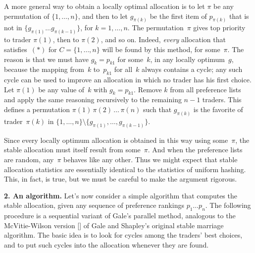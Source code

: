 A more general way to obtain a locally optimal allocation is to let $\pi$ be
any permutation of $\{1,\ldots,n\}$, and then to let $g_{\pi(k)}$ be the first
item of $p_{\pi(k)}$ that is not in $\{g_{\pi(1)}\ldots g_{\pi(k-1)}\}$, for
$k=1,\ldots,n$. The permutation~$\pi$ gives top priority to trader $\pi(1)$,
then to $\pi(2)$, and so on. Indeed, {\it every\/} allocation that
satisfies~$(\ast)$ for $C=\{1,\ldots,n\}$ will be found by this method, for
some~$\pi$. The reason is that we must have $g_k=p_{k1}$ for some~$k$, in any
locally optimum~$g$, because the mapping from~$k$ to~$p_{k1}$ for all~$k$
always contains a cycle; any such cycle can be used to improve an allocation in
which no trader has his first choice. Let $\pi(1)$ be any value of~$k$ with
$g_k=p_{k1}$. Remove $k$ from all preference lists and apply the same reasoning
recursively to the remaining $n-1$ traders. This defines a permutation
$\pi(1)\,\pi(2)\,\ldots\,\pi(n)$ such that $g_{\pi(k)}$ is the favorite of
trader~$\pi(k)$ in $\{1,\ldots,n\}\setminus\{g_{\pi(1)},\ldots,g_{\pi(k-1)}\}$.

Since every locally optimum allocation is obtained in this way using
some~$\pi$, the stable allocation must itself result from some~$\pi$. And when
the preference lists are random, any~$\pi$ behaves like any other. Thus we
might expect that stable allocation statistics are essentially identical to the
statistics of uniform hashing. This, in fact, is true, but we must be careful
to make the argument rigorous.

\meno
{\bf 2. An algorithm.}
Let's now consider a simple algorithm that computes the stable
 allocation, given
any sequence of preference rankings $p_1\ldots p_n$. The following procedure is
a sequential variant of Gale's parallel method, analogous to the McVitie-Wilson
version [\mw] of Gale and Shapley's original stable marriage algorithm. The
basic idea is to look for cycles among the traders' best choices, and to put
such cycles into the allocation whenever they are found.

